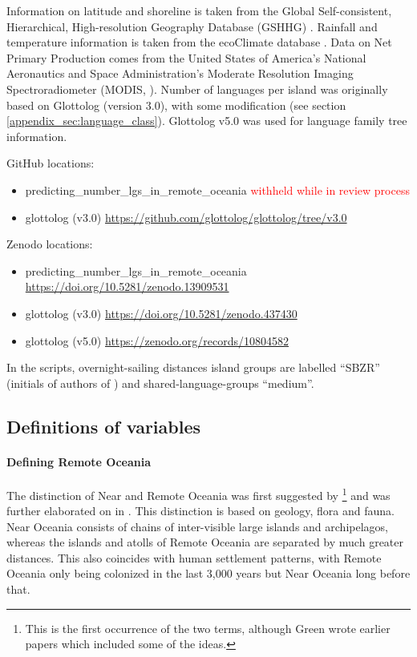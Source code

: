 \documentclass[unnumsec,webpdf,modern,medium]{oup-authoring-template}
\begin{document}
Information on latitude and shoreline is taken from the Global Self-consistent, Hierarchical, High-resolution Geography Database (GSHHG) \citep{wessel1996global}. Rainfall and temperature information is taken from the ecoClimate database \citep{ecoclimate}. Data on Net Primary Production comes from the  United States of America's National Aeronautics and Space Administration's Moderate Resolution Imaging Spectroradiometer (MODIS, \citet{running2021modis_terra, running2021modis_aqua}). Number of languages per island was originally based on Glottolog (version 3.0), with some modification (see section \ref{appendix_sec:language_class}). Glottolog v5.0 \citet{Glottolog5} was used for language family tree information. 

GitHub locations:
\begin{itemize}
\item predicting\_number\_lgs\_in\_remote\_oceania  \textcolor{red}{withheld while in review process}
\item glottolog (v3.0) \url{https://github.com/glottolog/glottolog/tree/v3.0}
\end{itemize}

Zenodo locations:
\begin{itemize}
\item predicting\_number\_lgs\_in\_remote\_oceania  \url{https://doi.org/10.5281/zenodo.13909531}
\item glottolog (v3.0) \url{https://doi.org/10.5281/zenodo.437430}
\item glottolog (v5.0) \url{https://zenodo.org/records/10804582}

\end{itemize}

In the scripts, overnight-sailing distances island groups are labelled ``SBZR'' (initials of authors of \cite{NZSA_overnight_2023}) and shared-language-groups ``medium''.
\newpage

\subsection{Definitions of variables}
\label{appendix_def}
\FloatBarrier
\paragraph{Defining Remote Oceania}
The distinction of Near and Remote Oceania was first suggested by \citet{pawley1973dating}\footnote{This is the first occurrence of the two terms, although Green wrote earlier papers which included some of the ideas.} and was further elaborated on in \citet{green1991near}. This distinction is based on geology, flora and fauna. Near Oceania consists of chains of inter-visible large islands and archipelagos, whereas the islands and atolls of Remote Oceania are separated by much greater distances. This also coincides with human settlement patterns, with Remote Oceania only being colonized in the last 3,000 years but Near Oceania long before that.
\end{document}
